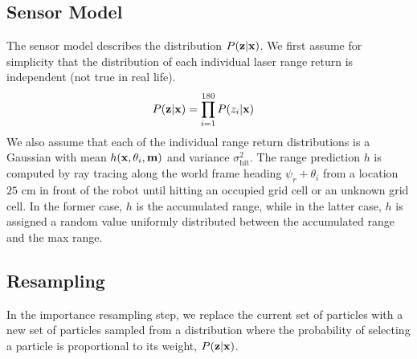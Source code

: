 \subsection{Sensor Model}
\label{sec:sensor_model}
The sensor model describes the distribution $P(\mathbf{z} | \mathbf{x})$.
We first assume for simplicity that the distribution of each individual laser range return is independent (not true in real life).
\begin{align}
  P(\mathbf{z} | \mathbf{x}) &= \prod_{i=1}^{180} P(z_i | \mathbf{x}) \label{eq:pzx_indep}
\end{align}
We also assume that each of the individual range return distributions is a Gaussian with mean $h(\mathbf{x},\theta_i, \mathbf{m})$ and variance $\sigma_\text{hit}^2$.
The range prediction $h$ is computed by ray tracing along the world frame heading $\psi_r + \theta_i$ from a location $25$ cm in front of the robot until hitting an occupied grid cell or an unknown grid cell.
In the former case, $h$ is the accumulated range, while in the latter case, $h$ is assigned a random value uniformly distributed between the accumulated range and the max range.


\subsection{Resampling}
In the importance resampling step, we replace the current set of particles with a new set of particles sampled from a distribution where the probability of selecting a particle is proportional to its weight, $P(\mathbf{z} | \mathbf{x})$.
